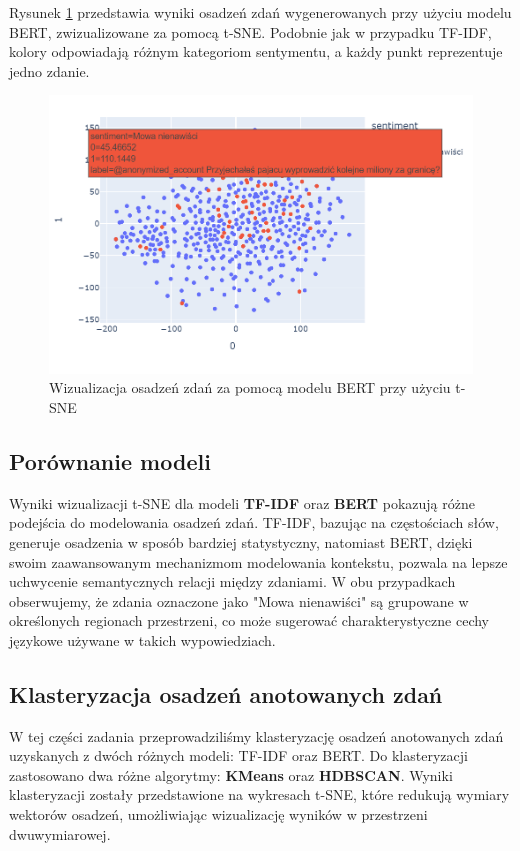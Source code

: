 \documentclass[12pt]{article}
\begin{document}
Rysunek \ref{fig:bert_tsne} przedstawia wyniki osadzeń zdań wygenerowanych przy użyciu modelu BERT, zwizualizowane za pomocą t-SNE. Podobnie jak w przypadku TF-IDF, kolory odpowiadają różnym kategoriom sentymentu, a każdy punkt reprezentuje jedno zdanie.

\begin{figure}[H]
    \centering
    \includegraphics[width=\textwidth]{../../plots/bert-t-sne.png}
    \caption{Wizualizacja osadzeń zdań za pomocą modelu BERT przy użyciu t-SNE}
    \label{fig:bert_tsne}
\end{figure}

\subsection{Porównanie modeli}

Wyniki wizualizacji t-SNE dla modeli \textbf{TF-IDF} oraz \textbf{BERT} pokazują różne podejścia do modelowania osadzeń zdań. TF-IDF, bazując na częstościach słów, generuje osadzenia w sposób bardziej statystyczny, natomiast BERT, dzięki swoim zaawansowanym mechanizmom modelowania kontekstu, pozwala na lepsze uchwycenie semantycznych relacji między zdaniami. W obu przypadkach obserwujemy, że zdania oznaczone jako "Mowa nienawiści" są grupowane w określonych regionach przestrzeni, co może sugerować charakterystyczne cechy językowe używane w takich wypowiedziach.

\subsection{Klasteryzacja osadzeń anotowanych zdań}

W tej części zadania przeprowadziliśmy klasteryzację osadzeń anotowanych zdań uzyskanych z dwóch różnych modeli: TF-IDF oraz BERT. Do klasteryzacji zastosowano dwa różne algorytmy: \textbf{KMeans} oraz \textbf{HDBSCAN}. Wyniki klasteryzacji zostały przedstawione na wykresach t-SNE, które redukują wymiary wektorów osadzeń, umożliwiając wizualizację wyników w przestrzeni dwuwymiarowej.
\end{document}
